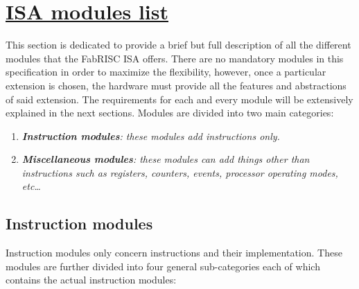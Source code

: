 \section[ISA modules list]{\LARGE\underline{ISA modules list}}

    \vspace{10pt}

    This section is dedicated to provide a brief but full description of all the different modules that the FabRISC ISA offers. There are no mandatory modules in this specification in order to maximize the flexibility, however, once a particular extension is chosen, the hardware must provide all the features and abstractions of said extension. The requirements for each and every module will be extensively explained in the next sections. Modules are divided into two main categories:

    \begin{enumerate}

        \item \textit{\textbf{Instruction modules}: these modules add instructions only.}
        \item \textit{\textbf{Miscellaneous modules}: these modules can add things other than instructions such as registers, counters, events, processor operating modes, etc\ldots}

    \end{enumerate}

    \subsection{Instruction modules}

        Instruction modules only concern instructions and their implementation. These modules are further divided into four general sub-categories each of which contains the actual instruction modules:

